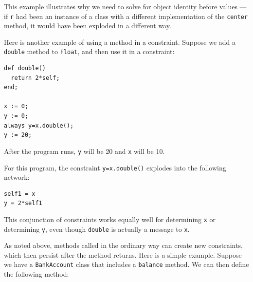 \documentclass{article}
\begin{document}
This example illustrates why we need to solve for object identity
before values --- if \verb|r| had been an instance of a class with a
different implementation of the \verb|center| method, it would have
been exploded in a different way.




Here is another example of using a method in a constraint.  Suppose we
add a \verb|double| method to \verb|Float|, and then use it in a
constraint:

\begin{verbatim}
def double()
  return 2*self;
end;

x := 0;
y := 0;
always y=x.double();
y := 20;
\end{verbatim}

After the program runs, \verb|y| will be 20 and \verb|x| will be 10.

For this program, the constraint \verb|y=x.double()| explodes into the
following network:

\begin{verbatim}
self1 = x
y = 2*self1
\end{verbatim}

This conjunction of constraints works equally well for determining
\verb|x| or determining \verb|y|, even though \verb|double| is
actually a message to \verb|x|.

As noted above, methods called in the ordinary way can create new
constraints, which then persist after the method returns.  Here is a
simple example.  Suppose we have a \verb|BankAccount| class that
includes a \verb|balance| method.  We can then define the following method:
\end{document}
